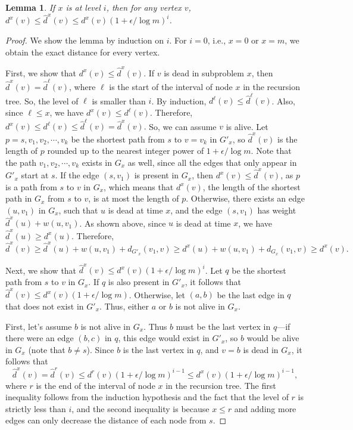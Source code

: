 \documentclass[11pt]{article}
\newtheorem{lemma}{Lemma}
\begin{document}
\begin{lemma}
\label{lem:refined_approx}
   If $x$ is at level $i$, then for any vertex $v$, $d^x(v) \leq \hat{d}^x(v) \leq d^x(v)(1 + \epsilon/ \log m)^i$. 
\end{lemma}
\begin{proof}
    We show the lemma by induction on $i$.  For $i = 0$, i.e., $x=0$ or $x=m$, we obtain the exact distance for every vertex. 
    
    First, we show that $d^x(v) \leq \hat{d}^x(v)$. If $v$ is dead in subproblem $x$, then $\hat{d}^x(v) = \hat{d}^\ell(v)$, where $\ell$ is the start of the interval of node $x$ in the recursion tree. So, the level of $\ell$ is smaller than $i$. By induction, $d^\ell(v) \leq \hat{d}^\ell(v)$. Also, since $\ell \leq x$, we have $d^x(v) \leq d^\ell(v)$. Therefore, 
    $d^x(v) \leq d^\ell(v) \leq \hat{d}^\ell(v) = \hat{d}^x(v).$ So, we can assume $v$ is alive.  
    Let $p = s, v_1, v_2, \cdots, v_k$ be the shortest path from $s$ to $v=v_k$ in $G'_x$, so $\hat{d}^x(v)$ is the length of $p$ rounded up to the nearest integer power of $1 + \epsilon/\log m$.  
    Note that the path $v_1, v_2, \cdots, v_k$ exists in $G_x$ as well, since all the edges that only appear in $G'_x$ start at $s$. 
    If the edge $(s,v_1)$ is present in $G_x$, then $d^x(v) \leq \hat{d}^x(v)$, as $p$ is a path from $s$ to $v$ in $G_x$, which means that $d^x(v)$, the length of the shortest path in $G_x$ from $s$ to $v$, is at most the length of $p$.
    Otherwise, there exists an edge $(u, v_1)$ in $G_x$, such that $u$ is dead at time $x$, and the edge $(s,v_1)$ has weight $\hat{d}^{x}(u) + w(u, v_1)$.
    As shown above, since $u$ is dead at time $x$, we have $\hat{d}^{x}(u) \geq d^x(u)$.
    Therefore, 
    \[\hat{d}^x(v) \geq \hat{d}^{x}(u) + w(u, v_1) + d_{G'_x}(v_1, v) \geq d^x(u) + w(u, v_1) + d_{G_x}(v_1, v) \geq d^x(v).\]
    
    Next, we show that $\hat{d}^x(v) \leq d^x(v)(1 + \epsilon/ \log m)^i$. 
    Let $q$ be the shortest path from $s$ to $v$ in $G_x$.
    If $q$ is also present in $G'_x$, it follows that $\hat{d}^x(v) \leq d^x(v)(1 + \epsilon/ \log m)$.
    Otherwise, let $(a,b)$ be the last edge in $q$ that does not exist in $G'_x$. 
    Thus, either $a$ or $b$ is not alive in $G_x$. 
    
    First, let's assume $b$ is not alive in $G_x$.  Thus $b$ must be the last vertex in $q$---if there were an edge $(b,c)$ in $q$, this edge would exist in $G'_x$, so $b$ would be alive in $G_x$ (note that $b \neq s$).
    Since $b$ is the last vertex in $q$, and $v=b$ is dead in $G_x$, it follows that 
    \[
        \hat{d}^x(v) = \hat{d}^r(v) 
        \leq d^r(v)(1 + \epsilon/ \log m)^{i-1} 
        \leq d^x(v)(1 + \epsilon/ \log m)^{i-1},
    \]
    where $r$ is the end of the interval of node $x$ in the recursion tree.
    The first inequality follows from the induction hypothesis and the fact that the level of $r$ is strictly less than $i$, and the second inequality is because $x \leq r$ and adding more edges can only decrease the distance of each node from $s$.
    

\end{proof}
\end{document}
